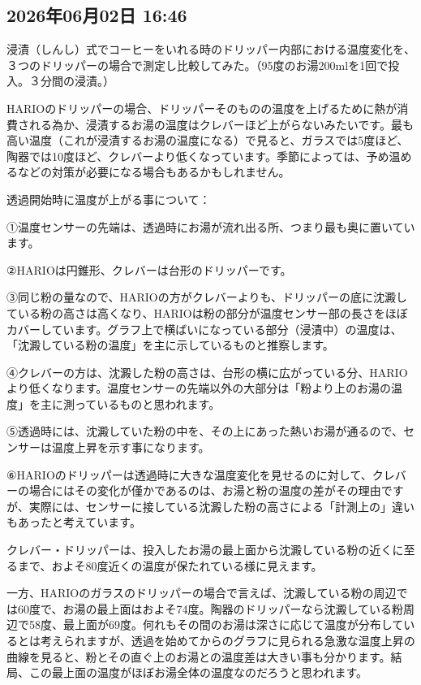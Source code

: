 \subsection*{2026年06月02日 16:46}

浸漬（しんし）式でコーヒーをいれる時のドリッパー内部における温度変化を、３つのドリッパーの場合で測定し比較してみた。（95度のお湯200mlを1回で投入。３分間の浸漬。）

HARIOのドリッパーの場合、ドリッパーそのものの温度を上げるために熱が消費される為か、浸漬するお湯の温度はクレバーほど上がらないみたいです。最も高い温度（これが浸漬するお湯の温度になる）で見ると、ガラスでは5度ほど、陶器では10度ほど、クレバーより低くなっています。季節によっては、予め温めるなどの対策が必要になる場合もあるかもしれません。

透過開始時に温度が上がる事について：

①温度センサーの先端は、透過時にお湯が流れ出る所、つまり最も奥に置いています。

②HARIOは円錐形、クレバーは台形のドリッパーです。

③同じ粉の量なので、HARIOの方がクレバーよりも、ドリッパーの底に沈澱している粉の高さは高くなり、HARIOは粉の部分が温度センサー部の長さをほぼカバーしています。グラフ上で横ばいになっている部分（浸漬中）の温度は、「沈澱している粉の温度」を主に示しているものと推察します。

④クレバーの方は、沈澱した粉の高さは、台形の横に広がっている分、HARIOより低くなります。温度センサーの先端以外の大部分は「粉より上のお湯の温度」を主に測っているものと思われます。

⑤透過時には、沈澱していた粉の中を、その上にあった熱いお湯が通るので、センサーは温度上昇を示す事になります。

⑥HARIOのドリッパーは透過時に大きな温度変化を見せるのに対して、クレバーの場合にはその変化が僅かであるのは、お湯と粉の温度の差がその理由ですが、実際には、センサーに接している沈澱した粉の高さによる「計測上の」違いもあったと考えています。

クレバー・ドリッパーは、投入したお湯の最上面から沈澱している粉の近くに至るまで、およそ80度近くの温度が保たれている様に見えます。

一方、HARIOのガラスのドリッパーの場合で言えば、沈澱している粉の周辺では60度で、お湯の最上面はおよそ74度。陶器のドリッパーなら沈澱している粉周辺で58度、最上面が69度。何れもその間のお湯は深さに応じて温度が分布しているとは考えられますが、透過を始めてからのグラフに見られる急激な温度上昇の曲線を見ると、粉とその直ぐ上のお湯との温度差は大きい事も分かります。結局、この最上面の温度がほぼお湯全体の温度なのだろうと思われます。

